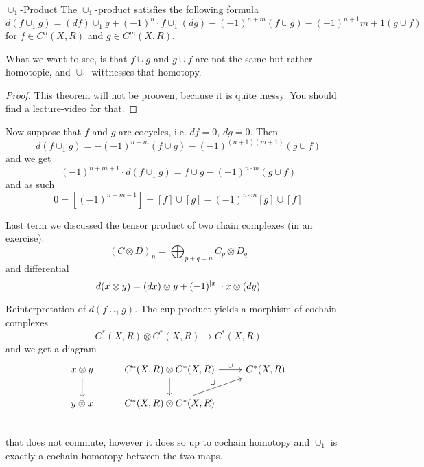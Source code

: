 \documentclass[language=english]{TemplateLecture}
\begin{document}
\begin{thm}{\(\cup_1\)-Product}{}
    The \(\cup_1\)-product satisfies the following formula
    \[d(f\cup_1 g) = (df) \cup_1 g + (-1)^n \cdot f \cup_1 (dg) - (-1)^{n+m}(f\cup g) - (-1)^{n+1}{m+1}(g\cup f)\]
    for \(f \in C^n(X,R)\) and \(g \in C^m(X,R)\).
\end{thm}

\begin{remark}
    What we want to see, is that \(f\cup g\) and \(g\cup f\) are not the same but rather homotopic, and \(\cup_1\) wittnesses that homotopy.
\end{remark}

\begin{proof}
    This theorem will not be prooven, because it is quite messy. You should find a lecture-video for that.
\end{proof}

Now suppose that \(f\) and \(g\) are cocycles, i.e. \(df = 0\), \(dg = 0\). Then
\[d(f\cup_1 g) = -(-1)^{n+m}(f\cup g) - (-1)^{(n+1)(m+1)}(g\cup f) \]
and we get
\[(-1)^{n+m+1}\cdot d(f\cup_1 g) = f\cup g - (-1)^{n \cdot m} (g\cup f)\] and as such
\[0 = [(-1)^{n+m-1}] = [f] \cup [g] - (-1)^{n\cdot m} [g] \cup [f]\]

\begin{remark}
    Last term we discussed the tensor product of two chain complexes (in an exercise):
    \[(C\otimes D)_n = \bigoplus_{p+q = n} C_p \otimes D_q\]
    and differential
    \[d(x\otimes y) = (dx) \otimes y + (-1)^{\lvert x\rvert} \cdot x \otimes (dy)\]
\end{remark}

\begin{remark}
    Reinterpretation of \(d(f \cup_1 g)\).
    The cup product yields a morphism of cochain complexes
    \[C^*(X,R) \otimes C^*(X,R) \to C^*(X,R)\]
    and we get a diagram
    \[\begin{tikzcd}
        x \otimes y \ar[d] & C^*(X,R) \otimes C^*(X,R) \ar[r, "\cup"] \ar[d] & C^*(X,R) \\
        y \otimes x & C^*(X,R) \otimes C^*(X,R) \ar[ru, "\cup"] & \\
    \end{tikzcd}\]
    that does not commute, however it does so up to cochain homotopy and \(\cup_1\) is exactly a cochain homotopy between the two maps.
\end{remark}


\end{document}
